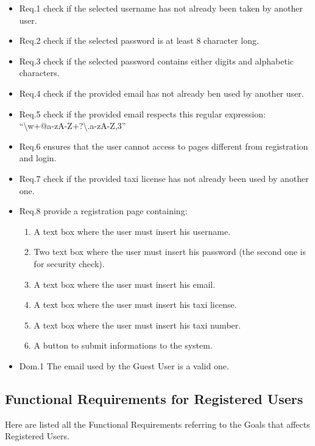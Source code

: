 				\begin{itemize}
					\item \lbrack Req.1\rbrack \label{sec:fr1_g3} check if the selected username has not already been taken by another user.
					\item \lbrack Req.2\rbrack \label{sec:fr2_g3} check if the selected password is at least 8 character long.
					\item \lbrack Req.3\rbrack \label{sec:fr3_g3} check if the selected password contains either digits and alphabetic characters.
					\item \lbrack Req.4\rbrack \label{sec:fr4_g3} check if the provided email has not already ben used by another user.
					\item \lbrack Req.5\rbrack \label{sec:fr5_g3} check if the provided email respects this regular expression:\\ \textquotedblleft\textbackslash w+@\lbrack a-zA-Z\textunderscore\rbrack +?\textbackslash .\lbrack a-zA-Z\rbrack{},3\textbraceright\textdollar\textquotedblright
					\item \lbrack Req.6\rbrack \label{sec:fr6_g3} ensures that the user cannot access to pages different from registration and login.
					\item \lbrack Req.7\rbrack \label{sec:fr7_g3} check if the provided taxi license has not already been used by another one.
					\item \lbrack Req.8\rbrack \label{sec:fr8_g3} provide a registration page containing:
						\begin{enumerate}
							\item A text box where the user must insert his username.
							\item Two text box where the user must insert his password (the second one is for security check).
							\item A text box where the user must insert his email.
							\item A text box where the user must insert his taxi license.
							\item A text box where the user must insert his taxi number.
							\item A button to submit informations to the system.
						\end{enumerate}
					\item \lbrack Dom.1\rbrack \label{sec:da1_g3} The email used by the Guest User is a valid one.
				\end{itemize}

		\subsection{Functional Requirements for Registered Users}
		Here are listed all the Functional Requirements referring to the Goals that affects Registered Users.

